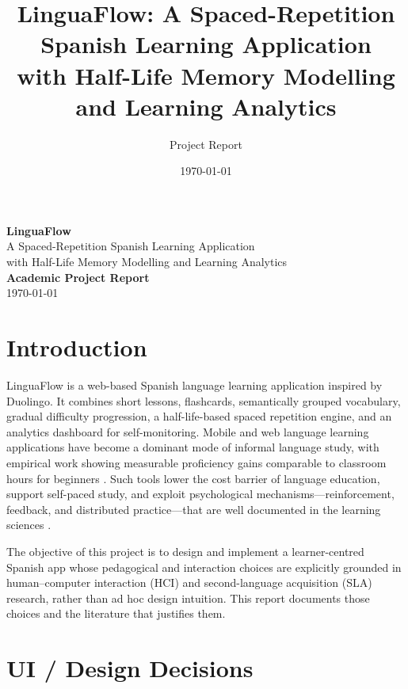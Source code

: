 \documentclass[11pt,a4paper]{article}
\title{\textbf{LinguaFlow: A Spaced-Repetition Spanish Learning Application \\ with Half-Life Memory Modelling and Learning Analytics}}
\author{Project Report}
\date{\today}
\begin{document}
\begin{titlepage}
  \centering
  \vspace*{2cm}
  {\Huge \textbf{LinguaFlow}}\\[0.5cm]
  {\Large A Spaced-Repetition Spanish Learning Application}\\[0.3cm]
  {\large with Half-Life Memory Modelling and Learning Analytics}\\[2cm]
  {\large \textbf{Academic Project Report}}\\[1cm]
  \vfill
  {\large \today}
\end{titlepage}

\tableofcontents
\newpage

\section{Introduction}
LinguaFlow is a web-based Spanish language learning application inspired by Duolingo. It combines short lessons, flashcards, semantically grouped vocabulary, gradual difficulty progression, a half-life-based spaced repetition engine, and an analytics dashboard for self-monitoring. Mobile and web language learning applications have become a dominant mode of informal language study, with empirical work showing measurable proficiency gains comparable to classroom hours for beginners \cite{vesselinov2012duolingo,loewen2019duolingo}. Such tools lower the cost barrier of language education, support self-paced study, and exploit psychological mechanisms—reinforcement, feedback, and distributed practice—that are well documented in the learning sciences \cite{cepeda2006distributed}.

The objective of this project is to design and implement a learner-centred Spanish app whose pedagogical and interaction choices are explicitly grounded in human--computer interaction (HCI) and second-language acquisition (SLA) research, rather than ad hoc design intuition. This report documents those choices and the literature that justifies them.

\section{UI / Design Decisions}
\end{document}
